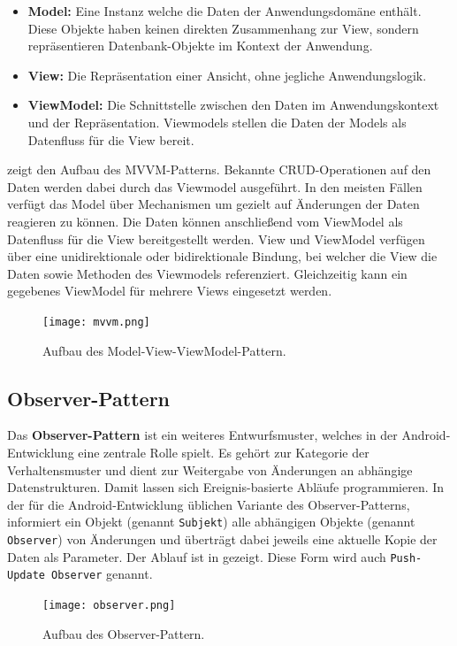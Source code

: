 \begin{itemize}
    \item \textbf{Model:} Eine Instanz welche die Daten der Anwendungsdomäne enthält. Diese Objekte haben keinen direkten Zusammenhang zur View, sondern repräsentieren Datenbank-Objekte im Kontext der Anwendung.
    \item \textbf{View:} Die Repräsentation einer Ansicht, ohne jegliche Anwendungslogik.
    \item \textbf{ViewModel:} Die Schnittstelle zwischen den Daten im Anwendungskontext und der Repräsentation. Viewmodels stellen die Daten der Models als Datenfluss für die View bereit. 
\end{itemize}

 zeigt den Aufbau des MVVM-Patterns. Bekannte CRUD-Operationen auf den Daten werden dabei durch das Viewmodel ausgeführt. In den meisten Fällen verfügt das Model über Mechanismen um gezielt auf Änderungen der Daten reagieren zu können. Die Daten können anschließend vom ViewModel als Datenfluss für die View bereitgestellt werden. View und ViewModel verfügen über eine unidirektionale oder bidirektionale Bindung, bei welcher die View die Daten sowie Methoden des Viewmodels referenziert. Gleichzeitig kann ein gegebenes ViewModel für mehrere Views eingesetzt werden.

\begin{figure}[H]
    \texttt{[image: mvvm.png]}
    \caption{Aufbau des Model-View-ViewModel-Pattern.}\label{fig:mvvm}
\end{figure}

\newpage

\subsection{Observer-Pattern}

Das \textbf{Observer-Pattern} ist ein weiteres Entwurfsmuster, welches in der Android-Entwicklung eine zentrale Rolle spielt. Es gehört zur Kategorie der Verhaltensmuster und dient zur Weitergabe von Änderungen an abhängige Datenstrukturen. Damit lassen sich Ereignis-basierte Abläufe programmieren. In der für die Android-Entwicklung üblichen Variante des Observer-Patterns, informiert ein Objekt (genannt \texttt{Subjekt}) alle  abhängigen Objekte (genannt \texttt{Observer}) von Änderungen und überträgt dabei jeweils eine aktuelle Kopie der Daten als Parameter. Der Ablauf ist in  gezeigt. Diese Form wird auch \texttt{Push-Update Observer} genannt. 

\begin{figure}[H]
    \texttt{[image: observer.png]}
    \caption{Aufbau des Observer-Pattern.}\label{fig:observer}
\end{figure}